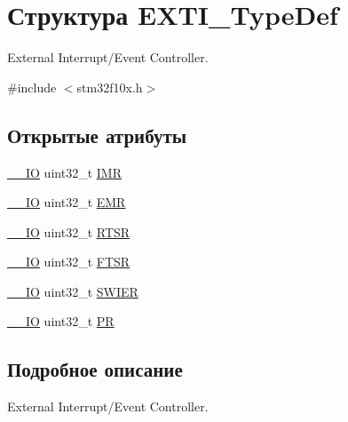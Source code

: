 \hypertarget{struct_e_x_t_i___type_def}{}\section{Структура E\+X\+T\+I\+\_\+\+Type\+Def}
\label{struct_e_x_t_i___type_def}


External Interrupt/\+Event Controller.  




{\ttfamily \#include $<$stm32f10x.\+h$>$}

\subsection*{Открытые атрибуты}
\begin{DoxyCompactItemize}
\item 
\mbox{\hyperlink{group___c_m_s_i_s___c_m3__core__definitions_gaec43007d9998a0a0e01faede4133d6be}{\+\_\+\+\_\+\+IO}} uint32\+\_\+t \mbox{\hyperlink{struct_e_x_t_i___type_def_a17d061db586d4a5aa646b68495a8e6a4}{I\+MR}}
\item 
\mbox{\hyperlink{group___c_m_s_i_s___c_m3__core__definitions_gaec43007d9998a0a0e01faede4133d6be}{\+\_\+\+\_\+\+IO}} uint32\+\_\+t \mbox{\hyperlink{struct_e_x_t_i___type_def_a9c5bff67bf9499933959df7eb91a1bd6}{E\+MR}}
\item 
\mbox{\hyperlink{group___c_m_s_i_s___c_m3__core__definitions_gaec43007d9998a0a0e01faede4133d6be}{\+\_\+\+\_\+\+IO}} uint32\+\_\+t \mbox{\hyperlink{struct_e_x_t_i___type_def_ac019d211d8c880b327a1b90a06cc0675}{R\+T\+SR}}
\item 
\mbox{\hyperlink{group___c_m_s_i_s___c_m3__core__definitions_gaec43007d9998a0a0e01faede4133d6be}{\+\_\+\+\_\+\+IO}} uint32\+\_\+t \mbox{\hyperlink{struct_e_x_t_i___type_def_aee667dc148250bbf37fdc66dc4a9874d}{F\+T\+SR}}
\item 
\mbox{\hyperlink{group___c_m_s_i_s___c_m3__core__definitions_gaec43007d9998a0a0e01faede4133d6be}{\+\_\+\+\_\+\+IO}} uint32\+\_\+t \mbox{\hyperlink{struct_e_x_t_i___type_def_a5c1f538e64ee90918cd158b808f5d4de}{S\+W\+I\+ER}}
\item 
\mbox{\hyperlink{group___c_m_s_i_s___c_m3__core__definitions_gaec43007d9998a0a0e01faede4133d6be}{\+\_\+\+\_\+\+IO}} uint32\+\_\+t \mbox{\hyperlink{struct_e_x_t_i___type_def_a133294b87dbe6a01e8d9584338abc39a}{PR}}
\end{DoxyCompactItemize}


\subsection{Подробное описание}
External Interrupt/\+Event Controller. 

